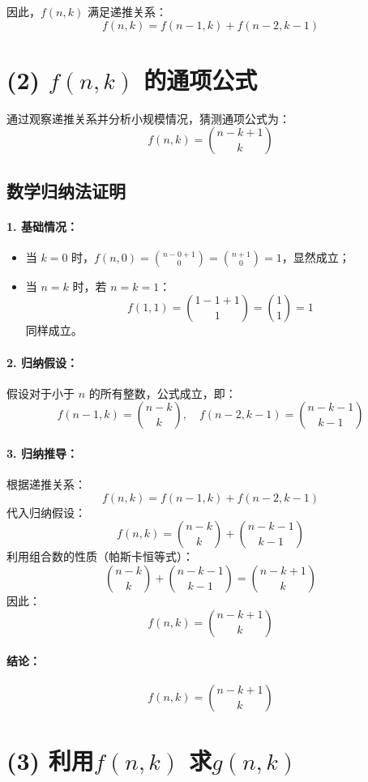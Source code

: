 \documentclass{article}
\begin{document}
因此，$f(n, k)$ 满足递推关系：
\[
\boxed{f(n, k) = f(n-1, k) + f(n-2, k-1)}
\]

\section*{(2) $f(n, k)$ 的通项公式}

通过观察递推关系并分析小规模情况，猜测通项公式为：
\[
f(n, k) = \binom{n-k+1}{k}
\]

\subsection*{数学归纳法证明}

\paragraph{1. 基础情况：}
\begin{itemize}
    \item 当 $k = 0$ 时，$f(n, 0) = \binom{n - 0 + 1}{0} = \binom{n+1}{0} = 1$，显然成立；
    \item 当 $n = k$ 时，若 $n = k = 1$：
    \[
    f(1, 1) = \binom{1 - 1 + 1}{1} = \binom{1}{1} = 1
    \]
    同样成立。
\end{itemize}

\paragraph{2. 归纳假设：}
假设对于小于 $n$ 的所有整数，公式成立，即：
\[
f(n-1, k) = \binom{n-k}{k}, \quad f(n-2, k-1) = \binom{n-k-1}{k-1}
\]

\paragraph{3. 归纳推导：}
根据递推关系：
\[
f(n, k) = f(n-1, k) + f(n-2, k-1)
\]
代入归纳假设：
\[
f(n, k) = \binom{n-k}{k} + \binom{n-k-1}{k-1}
\]
利用组合数的性质（帕斯卡恒等式）：
\[
\binom{n-k}{k} + \binom{n-k-1}{k-1} = \binom{n-k+1}{k}
\]
因此：
\[
f(n, k) = \binom{n-k+1}{k}
\]

\paragraph{结论：}
\[
\boxed{f(n, k) = \binom{n-k+1}{k}}
\]

\section*{(3) 利用$f(n, k)$ 求$g(n, k)$}
\end{document}
